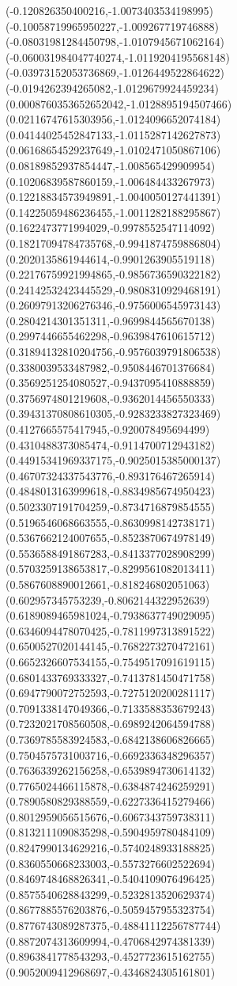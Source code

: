 {(-0.120826350400216,-1.0073403534198995)
(-0.10058719965950227,-1.009267719746888)
(-0.08031981284450798,-1.0107945671062164)
(-0.060031984047740274,-1.0119204195568148)
(-0.03973152053736869,-1.0126449522864622)
(-0.0194262394265082,-1.0129679924459234)
(0.0008760353652652042,-1.0128895194507466)
(0.02116747615303956,-1.0124096652074184)
(0.04144025452847133,-1.0115287142627873)
(0.06168654529237649,-1.0102471050867106)
(0.08189852937854447,-1.008565429909954)
(0.10206839587860159,-1.006484433267973)
(0.12218834573949891,-1.0040050127441391)
(0.14225059486236455,-1.0011282188295867)
(0.1622473771994029,-0.9978552547114092)
(0.18217094784735768,-0.9941874759886804)
(0.2020135861944614,-0.9901263905519118)
(0.22176759921994865,-0.9856736590322182)
(0.24142532423445529,-0.9808310929468191)
(0.26097913206276346,-0.9756006545973143)
(0.2804214301351311,-0.9699844565670138)
(0.2997446655462298,-0.9639847610615712)
(0.31894132810204756,-0.9576039791806538)
(0.3380039533487982,-0.9508446701376684)
(0.3569251254080527,-0.9437095410888859)
(0.3756974801219608,-0.9362014456550333)
(0.39431370808610305,-0.9283233827323469)
(0.4127665575417945,-0.920078495694499)
(0.4310488373085474,-0.9114700712943182)
(0.44915341969337175,-0.9025015385000137)
(0.46707324337543776,-0.893176467265914)
(0.4848013163999618,-0.8834985674950423)
(0.5023307191704259,-0.8734716879854555)
(0.5196546068663555,-0.8630998142738171)
(0.5367662124007655,-0.8523870674978149)
(0.5536588491867283,-0.8413377028908299)
(0.5703259138653817,-0.8299561082013411)
(0.5867608890012661,-0.818246802051063)
(0.602957345753239,-0.8062144322952639)
(0.6189089465981024,-0.7938637749029095)
(0.6346094478070425,-0.7811997313891522)
(0.6500527020144145,-0.7682273270472161)
(0.6652326607534155,-0.7549517091619115)
(0.6801433769333327,-0.7413781450471758)
(0.6947790072752593,-0.7275120200281117)
(0.7091338147049366,-0.7133588353679243)
(0.7232021708560508,-0.6989242064594788)
(0.7369785583924583,-0.6842138606826665)
(0.7504575731003716,-0.6692336348296357)
(0.7636339262156258,-0.6539894730614132)
(0.7765024466115878,-0.6384874246259291)
(0.7890580829388559,-0.6227336415279466)
(0.8012959056515676,-0.6067343759738311)
(0.8132111090835298,-0.5904959780484109)
(0.8247990134629216,-0.5740248933188825)
(0.8360550668233003,-0.5573276602522694)
(0.8469748468826341,-0.5404109076496425)
(0.8575540628843299,-0.5232813520629374)
(0.8677885576203876,-0.5059457955323754)
(0.8776743089287375,-0.48841112256787744)
(0.8872074313609994,-0.4706842974381339)
(0.8963841778543293,-0.4527723615162755)
(0.9052009412968697,-0.4346824305161801)
}
